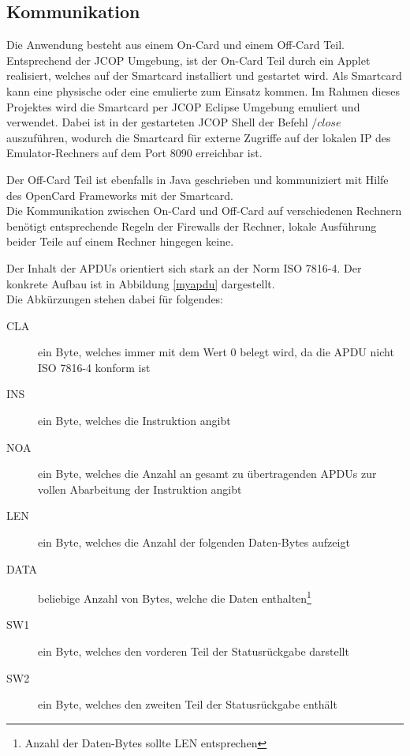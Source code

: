 \subsection{Kommunikation}
\label{subsec:3.0}

Die Anwendung besteht aus einem On-Card und einem Off-Card Teil.\\
Entsprechend der JCOP Umgebung, ist der On-Card Teil durch ein Applet realisiert, welches auf der Smartcard installiert und gestartet wird.
Als Smartcard kann eine physische oder eine emulierte zum Einsatz kommen.
Im Rahmen dieses Projektes wird die Smartcard per JCOP Eclipse Umgebung emuliert und verwendet.
Dabei ist in der gestarteten JCOP Shell der Befehl $/close$ auszuführen, wodurch die Smartcard für externe  Zugriffe auf der lokalen IP des Emulator-Rechners auf dem Port 8090 erreichbar ist.

Der Off-Card Teil ist ebenfalls in Java geschrieben und kommuniziert mit Hilfe des OpenCard Frameworks mit der Smartcard.
\\

Die Kommunikation zwischen On-Card und Off-Card auf verschiedenen Rechnern benötigt entsprechende Regeln der Firewalls der Rechner, lokale Ausführung beider Teile auf einem Rechner hingegen keine.

Der Inhalt der APDUs orientiert sich stark an der Norm ISO 7816-4. Der konkrete Aufbau ist in Abbildung \ref{myapdu} dargestellt.\\
Die Abkürzungen stehen dabei für folgendes:
\begin{description}
\item[CLA] ein Byte, welches immer mit dem Wert 0 belegt wird, da die APDU nicht ISO 7816-4 konform ist
\item[INS] ein Byte, welches die Instruktion angibt
\item[NOA] ein Byte, welches die Anzahl an gesamt zu übertragenden APDUs zur vollen Abarbeitung der Instruktion angibt
\item[LEN] ein Byte, welches die Anzahl der folgenden Daten-Bytes aufzeigt
\item[DATA] beliebige Anzahl von Bytes, welche die Daten enthalten\footnote{Anzahl der Daten-Bytes sollte LEN entsprechen}
\item[SW1] ein Byte, welches den vorderen Teil der Statusrückgabe darstellt
\item[SW2] ein Byte, welches den zweiten Teil der Statusrückgabe enthält
\end{description}


